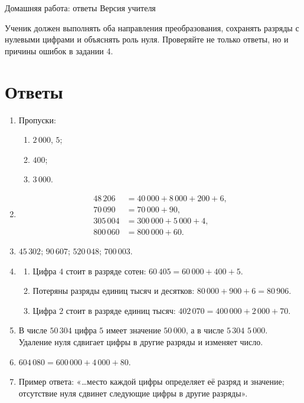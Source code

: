 \worksheettitle
  {Домашняя работа: ответы}
  { Версия учителя}

\begin{teacherbox}
  Ученик должен выполнять оба направления преобразования, сохранять разряды с
  нулевыми цифрами и объяснять роль нуля. Проверяйте не только ответы, но и
  причины ошибок в задании 4.
\end{teacherbox}

\section{Ответы}

\begin{enumerate}[label=\textbf{\arabic*.}]
  \item Пропуски:
    \begin{enumerate}
      \item \(2\,000\), \(5\);
      \item \(400\);
      \item \(3\,000\).
    \end{enumerate}

  \item
    \begin{align*}
      48\,206&=40\,000+8\,000+200+6,\\
      70\,090&=70\,000+90,\\
      305\,004&=300\,000+5\,000+4,\\
      800\,060&=800\,000+60.
    \end{align*}

  \item \(45\,302\); \(90\,607\); \(520\,048\); \(700\,003\).

  \item
    \begin{enumerate}
      \item Цифра \(4\) стоит в разряде сотен:
        \(60\,405=60\,000+400+5\).
      \item Потеряны разряды единиц тысяч и десятков:
        \(80\,000+900+6=80\,906\).
      \item Цифра \(2\) стоит в разряде единиц тысяч:
        \(402\,070=400\,000+2\,000+70\).
    \end{enumerate}

  \item В числе \(50\,304\) цифра \(5\) имеет значение \(50\,000\), а в
    числе \(5\,304\) \textemdash{} \(5\,000\). Удаление нуля сдвигает цифры в другие
    разряды и изменяет число.

  \item \(604\,080=600\,000+4\,000+80\).

  \item Пример ответа: «…место каждой цифры определяет её разряд и значение;
    отсутствие нуля сдвинет следующие цифры в другие разряды».
\end{enumerate}

